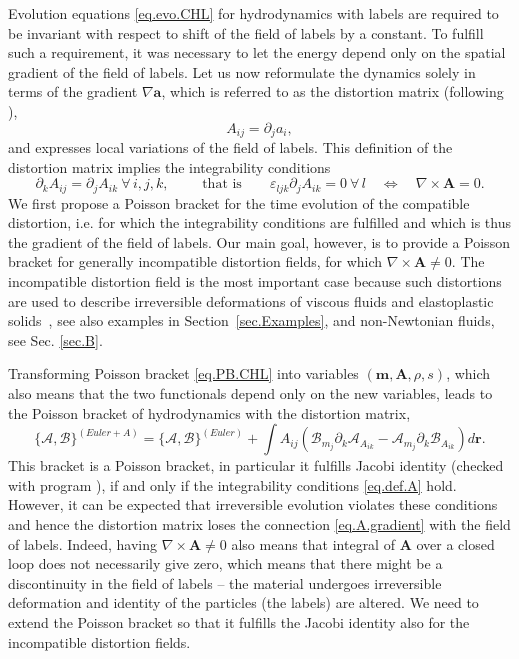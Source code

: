 \documentclass[twoside]{article}
\newcommand{\AAA}{{\boldsymbol{A}}}
\newcommand{\rr}{{\boldsymbol{r}}}
\newcommand{\aaa}{{\boldsymbol{a}}}
\newcommand{\mm}{{\boldsymbol{m}}}
\newcommand{\AF}{\mathscr{A}}
\newcommand{\BF}{\mathscr{B}}
\newcommand{\pd}{\partial}
\begin{document}
Evolution equations \eqref{eq.evo.CHL} for hydrodynamics with labels are required
to be invariant with respect to shift of the field of labels by a constant. To 
fulfill such a requirement, it was necessary to let the energy depend only on 
the spatial gradient of the field of labels. Let us now reformulate the 
dynamics solely in terms 
of the gradient $ \nabla\aaa $, which is referred to as the distortion matrix 
(following 
\cite{God1978,GodRom1998,GodRom2003,HPR2016,DPRZ2016}), 
\begin{equation}\label{eq.def.A}
A_{ij} = \pd_j a_i,
\end{equation}
and expresses local variations of the field of labels. This definition of the 
distortion matrix implies the integrability conditions
\begin{equation}\label{eq.A.gradient}
\pd_k A_{ij} = \pd_j A_{ik} \ \forall\, i, j, k,\qquad \text{ that is}\qquad 
\varepsilon_{ljk}\pd_j A_{ik} = 0\ \forall\, l \quad \iff \quad \nabla \times 
\AAA = 0.
\end{equation}
We first propose a Poisson bracket for the time evolution of the 
compatible distortion, i.e. for which the integrability conditions are 
fulfilled and which is thus the gradient  of the field of labels. Our 
main goal, however, is to provide a Poisson bracket for generally incompatible 
distortion fields, for which $ \nabla\times\AAA\neq 0 $. The incompatible 
distortion field is the most important case because such distortions are used 
to describe irreversible deformations of viscous fluids and elastoplastic 
solids~\cite{GodRom2003,HPR2016,DPRZ2016,HYP2016}, see also examples in 
Section~\ref{sec.Examples}, and non-Newtonian fluids, see Sec. \ref{sec.B}.


Transforming Poisson bracket \eqref{eq.PB.CHL} into variables $(\mm, \AAA, 
\rho,  s)$, which also means that the two functionals depend only on the new 
variables, leads to the Poisson bracket of hydrodynamics with the distortion 
matrix,
\begin{equation}\label{eq.PB.CHA}
\{\AF,\BF\}^{(Euler+A)} = \{\AF,\BF\}^{(Euler)} + \int 
A_{ij}\left(\BF_{m_j}\pd_k 
\AF_{A_{ik}} 
-\AF_{m_j}\pd_k \BF_{A_{ik}}\right)d\rr.
\end{equation}
This bracket is a Poisson bracket, in particular it fulfills Jacobi identity 
(checked with program \cite{kroeger2010}), 
if and only if the integrability conditions \eqref{eq.def.A} hold. However, it 
can be expected that irreversible evolution violates 
these conditions and hence the distortion matrix loses the connection 
\eqref{eq.A.gradient} with the field of labels. Indeed, having $\nabla\times 
\AAA\neq 
0$ also means that 
integral of $\AAA$ over a closed loop does not necessarily give zero, which 
means that there might be a discontinuity in the field of labels -- the 
material 
undergoes irreversible deformation and identity of the particles (the labels) 
are altered. We need to extend the Poisson bracket so that it fulfills
the Jacobi identity also for the incompatible distortion fields.
\end{document}
